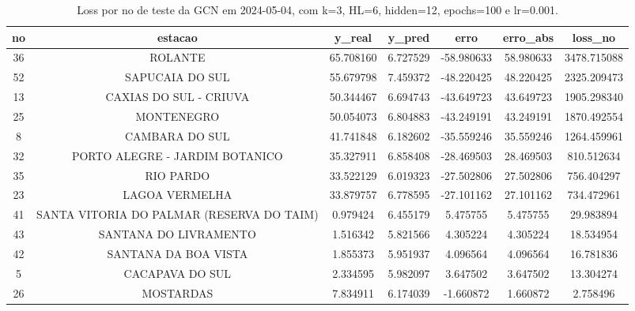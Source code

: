 \begin{table}[h]
\centering
\caption{Loss por no de teste da GCN em 2024-05-04, com k=3, HL=6, hidden=12, epochs=100 e lr=0.001.}
\label{tab:gcn_loss_k3_hl6_h12_e100_d20240504}
\begin{tabular}{ccccccc}
\toprule
no & estacao & y\_real & y\_pred & erro & erro\_abs & loss\_no \\
\midrule
36 & ROLANTE & 65.708160 & 6.727529 & -58.980633 & 58.980633 & 3478.715088 \\
52 & SAPUCAIA DO SUL & 55.679798 & 7.459372 & -48.220425 & 48.220425 & 2325.209473 \\
13 & CAXIAS DO SUL - CRIUVA & 50.344467 & 6.694743 & -43.649723 & 43.649723 & 1905.298340 \\
25 & MONTENEGRO & 50.054073 & 6.804883 & -43.249191 & 43.249191 & 1870.492554 \\
8 & CAMBARA DO SUL & 41.741848 & 6.182602 & -35.559246 & 35.559246 & 1264.459961 \\
32 & PORTO ALEGRE - JARDIM BOTANICO & 35.327911 & 6.858408 & -28.469503 & 28.469503 & 810.512634 \\
35 & RIO PARDO & 33.522129 & 6.019323 & -27.502806 & 27.502806 & 756.404297 \\
23 & LAGOA VERMELHA & 33.879757 & 6.778595 & -27.101162 & 27.101162 & 734.472961 \\
41 & SANTA VITORIA DO PALMAR (RESERVA DO TAIM) & 0.979424 & 6.455179 & 5.475755 & 5.475755 & 29.983894 \\
43 & SANTANA DO LIVRAMENTO & 1.516342 & 5.821566 & 4.305224 & 4.305224 & 18.534954 \\
42 & SANTANA DA BOA VISTA & 1.855373 & 5.951937 & 4.096564 & 4.096564 & 16.781836 \\
5 & CACAPAVA DO SUL & 2.334595 & 5.982097 & 3.647502 & 3.647502 & 13.304274 \\
26 & MOSTARDAS & 7.834911 & 6.174039 & -1.660872 & 1.660872 & 2.758496 \\
\bottomrule
\end{tabular}
\end{table}
